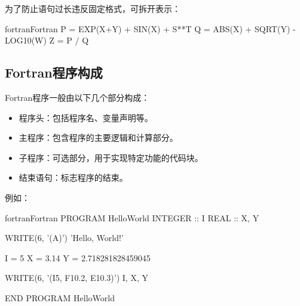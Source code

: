 为了防止语句过长违反固定格式，可拆开表示：
\begin{envcode}{fortran}{Fortran}
      P = EXP(X+Y) + SIN(X) + S**T
      Q = ABS(X) + SQRT(Y) - LOG10(W)
      Z = P / Q
\end{envcode}

\subsection{Fortran程序构成}
Fortran程序一般由以下几个部分构成：
\begin{itemize}
      \item 程序头：包括程序名、变量声明等。
      \item 主程序：包含程序的主要逻辑和计算部分。
      \item 子程序：可选部分，用于实现特定功能的代码块。
      \item 结束语句：标志程序的结束。
\end{itemize}
例如：
\begin{envcode}{fortran}{Fortran}
      PROGRAM HelloWorld
      INTEGER :: I
      REAL :: X, Y
      
      WRITE(6, '(A)') 'Hello, World!'
      
      I = 5
      X = 3.14
      Y = 2.718281828459045
      
      WRITE(6, '(I5, F10.2, E10.3)') I, X, Y
      
      END PROGRAM HelloWorld
\end{envcode}


